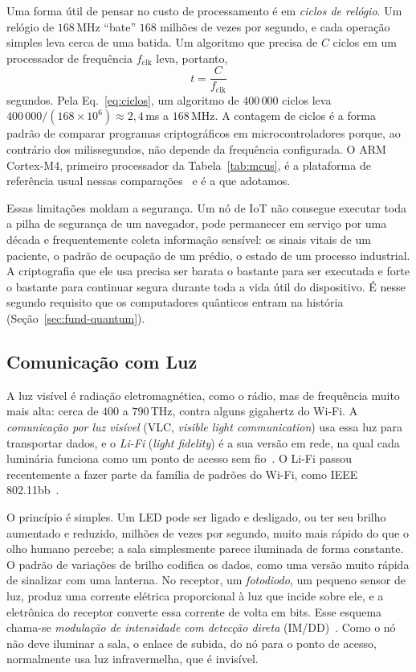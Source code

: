 Uma forma útil de pensar no custo de processamento é em \emph{ciclos de
relógio}. Um relógio de $168$\,MHz ``bate'' $168$ milhões de vezes por segundo,
e cada operação simples leva cerca de uma batida. Um algoritmo que precisa de
$C$ ciclos em um processador de frequência $f_{\mathrm{clk}}$ leva, portanto,
\begin{equation}
t = \frac{C}{f_{\mathrm{clk}}}
\label{eq:ciclos}
\end{equation}
segundos. Pela Eq.~\eqref{eq:ciclos}, um algoritmo de $400\,000$ ciclos leva
$400\,000/(168\times10^{6}) \approx 2{,}4$\,ms a $168$\,MHz. A contagem de
ciclos é a forma padrão de comparar programas criptográficos em
microcontroladores porque, ao contrário dos milissegundos, não depende da
frequência configurada. O ARM Cortex-M4, primeiro processador da
Tabela~\ref{tab:mcus}, é a plataforma de referência usual nessas
comparações~\cite{pqm4} e é a que adotamos.

Essas limitações moldam a segurança. Um nó de IoT não consegue executar toda a
pilha de segurança de um navegador, pode permanecer em serviço por uma década e
frequentemente coleta informação sensível: os sinais vitais de um paciente, o
padrão de ocupação de um prédio, o estado de um processo industrial. A
criptografia que ele usa precisa ser barata o bastante para ser executada e
forte o bastante para continuar segura durante toda a vida útil do dispositivo.
É nesse segundo requisito que os computadores quânticos entram na história
(Seção~\ref{sec:fund-quantum}).

\subsection{Comunicação com Luz}\label{sec:fund-light}
A luz visível é radiação eletromagnética, como o rádio, mas de frequência muito
mais alta: cerca de $400$ a $790$\,THz, contra alguns gigahertz do Wi-Fi. A
\emph{comunicação por luz visível} (VLC, \emph{visible light communication})
usa essa luz para transportar dados, e o \emph{Li-Fi} (\emph{light fidelity}) é
a sua versão em rede, na qual cada luminária funciona como um ponto de acesso
sem fio~\cite{haas2016lifi}. O Li-Fi passou recentemente a fazer parte da
família de padrões do Wi-Fi, como IEEE 802.11bb~\cite{ieee80211bb}.

O princípio é simples. Um LED pode ser ligado e desligado, ou ter seu brilho
aumentado e reduzido, milhões de vezes por segundo, muito mais rápido do que o
olho humano percebe; a sala simplesmente parece iluminada de forma constante. O
padrão de variações de brilho codifica os dados, como uma versão muito rápida
de sinalizar com uma lanterna. No receptor, um \emph{fotodiodo}, um pequeno
sensor de luz, produz uma corrente elétrica proporcional à luz que incide sobre
ele, e a eletrônica do receptor converte essa corrente de volta em bits. Esse
esquema chama-se \emph{modulação de intensidade com detecção direta}
(IM/DD)~\cite{kahn1997wireless,ghassemlooy2019owc}. Como o nó não deve iluminar
a sala, o enlace de subida, do nó para o ponto de acesso, normalmente usa luz
infravermelha, que é invisível.

